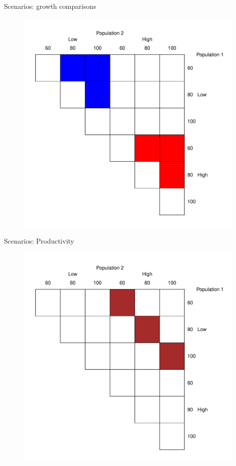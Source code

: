 \documentclass{beamer}
\begin{document}
\begin{withoutheadline}
\begin{frame}{Scenarios: growth comparisons}
  \begin{figure}
  \flushright
    \includegraphics[width=.7\textwidth]{scenario2}
  \end{figure}
\end{frame}
\end{withoutheadline}

\begin{withoutheadline}
\begin{frame}{Scenarios: Productivity}
  \begin{figure}
  \flushright
    \includegraphics[width=.7\textwidth]{scenario3}
  \end{figure}
\end{frame}
\end{withoutheadline}
\end{document}
